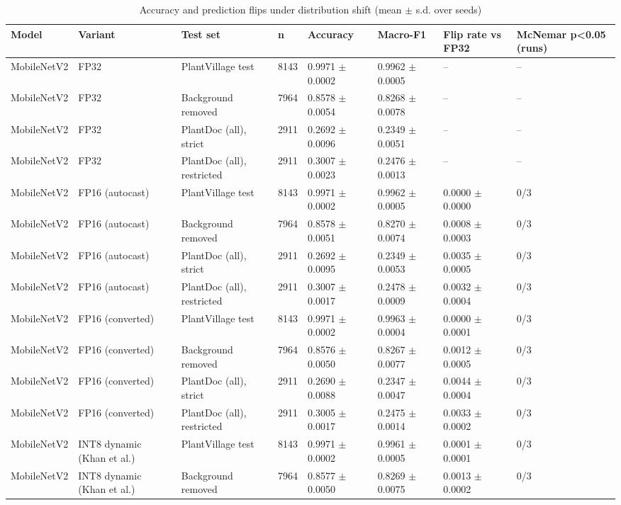 \begin{table}[t]
\centering
\caption{Accuracy and prediction flips under distribution shift (mean $\pm$ s.d. over seeds)}
\label{tab:tab04_shift}
\small
\begin{tabular}{llllllll}
\toprule
Model & Variant & Test set & n & Accuracy & Macro-F1 & Flip rate vs FP32 & McNemar p<0.05 (runs) \\
\midrule
MobileNetV2 & FP32 & PlantVillage test & 8143 & 0.9971 $\pm$ 0.0002 & 0.9962 $\pm$ 0.0005 & – & – \\
MobileNetV2 & FP32 & Background removed & 7964 & 0.8578 $\pm$ 0.0054 & 0.8268 $\pm$ 0.0078 & – & – \\
MobileNetV2 & FP32 & PlantDoc (all), strict & 2911 & 0.2692 $\pm$ 0.0096 & 0.2349 $\pm$ 0.0051 & – & – \\
MobileNetV2 & FP32 & PlantDoc (all), restricted & 2911 & 0.3007 $\pm$ 0.0023 & 0.2476 $\pm$ 0.0013 & – & – \\
MobileNetV2 & FP16 (autocast) & PlantVillage test & 8143 & 0.9971 $\pm$ 0.0002 & 0.9962 $\pm$ 0.0005 & 0.0000 $\pm$ 0.0000 & 0/3 \\
MobileNetV2 & FP16 (autocast) & Background removed & 7964 & 0.8578 $\pm$ 0.0051 & 0.8270 $\pm$ 0.0074 & 0.0008 $\pm$ 0.0003 & 0/3 \\
MobileNetV2 & FP16 (autocast) & PlantDoc (all), strict & 2911 & 0.2692 $\pm$ 0.0095 & 0.2349 $\pm$ 0.0053 & 0.0035 $\pm$ 0.0005 & 0/3 \\
MobileNetV2 & FP16 (autocast) & PlantDoc (all), restricted & 2911 & 0.3007 $\pm$ 0.0017 & 0.2478 $\pm$ 0.0009 & 0.0032 $\pm$ 0.0004 & 0/3 \\
MobileNetV2 & FP16 (converted) & PlantVillage test & 8143 & 0.9971 $\pm$ 0.0002 & 0.9963 $\pm$ 0.0004 & 0.0000 $\pm$ 0.0001 & 0/3 \\
MobileNetV2 & FP16 (converted) & Background removed & 7964 & 0.8576 $\pm$ 0.0050 & 0.8267 $\pm$ 0.0077 & 0.0012 $\pm$ 0.0005 & 0/3 \\
MobileNetV2 & FP16 (converted) & PlantDoc (all), strict & 2911 & 0.2690 $\pm$ 0.0088 & 0.2347 $\pm$ 0.0047 & 0.0044 $\pm$ 0.0004 & 0/3 \\
MobileNetV2 & FP16 (converted) & PlantDoc (all), restricted & 2911 & 0.3005 $\pm$ 0.0017 & 0.2475 $\pm$ 0.0014 & 0.0033 $\pm$ 0.0002 & 0/3 \\
MobileNetV2 & INT8 dynamic (Khan et al.) & PlantVillage test & 8143 & 0.9971 $\pm$ 0.0002 & 0.9961 $\pm$ 0.0005 & 0.0001 $\pm$ 0.0001 & 0/3 \\
MobileNetV2 & INT8 dynamic (Khan et al.) & Background removed & 7964 & 0.8577 $\pm$ 0.0050 & 0.8269 $\pm$ 0.0075 & 0.0013 $\pm$ 0.0002 & 0/3 \\

\end{tabular}
\end{table}
